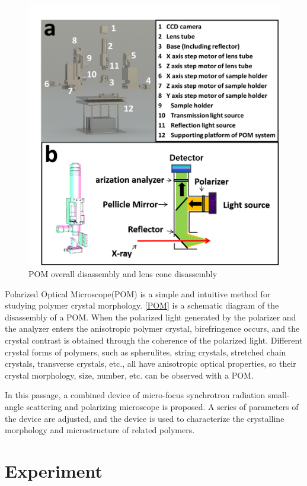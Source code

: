 \documentclass{Head}
\begin{document}
\begin{figure}
  \centering
  \includegraphics[scale=0.5]{Figures/Fig3POM.png}
  \caption{POM overall disassembly and lens cone disassembly}
  \label{POM}
\end{figure}
Polarized Optical Microscope(POM) is a simple and intuitive method for studying polymer crystal morphology.
\autoref{POM} is a schematic diagram of the disassembly of a POM.
When the polarized light generated by the polarizer and the analyzer enters the anisotropic polymer crystal, birefringence occurs, and the crystal contrast is obtained through the coherence of the polarized light.
Different crystal forms of polymers, such as spherulites, string crystals, stretched chain crystals, transverse crystals, etc., all have anisotropic optical properties, so their crystal morphology, size, number, etc. can be observed with a POM.


In this passage, a combined device of micro-focus synchrotron radiation small-angle scattering and polarizing microscope is proposed.
A series of parameters of the device are adjusted, and the device is used to characterize the crystalline morphology and microstructure of related polymers.
\section{Experiment}
\end{document}

